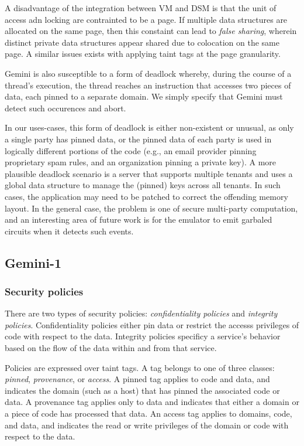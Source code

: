 %
A disadvantage of the integration between VM and DSM is that the unit of access
adn locking are contrainted to be a page.
%
If multiple data structures are allocated on the same page, then this constaint
can lead to \emph{false sharing}, wherein distinct private data structures
appear shared due to colocation on the same page.
%
A similar issues exists with applying taint tags at the page granularity.


Gemini is also susceptible to a form of deadlock whereby, during the course of
a thread's execution, the thread reaches an instruction that accesses two
pieces of data, each pinned to a separate domain.
%
We simply specify that Gemini must detect such occurences and abort.


In our uses-cases, this form of deadlock is either non-existent or unusual, as
only a single party has pinned data, or the pinned data of each party is used 
in logically different portions of the code (e.g., an email provider pinning
proprietary spam rules, and an organization pinning a private key).
%
A more plausible deadlock scenario is a server that supports multiple tenants
and uses a global data structure to manage the (pinned) keys across all
tenants.
%
In such cases, the application may need to be patched to correct the offending
memory layout.
%
In the general case, the problem is one of secure multi-party computation, and
an interesting area of future work is for the emulator to emit garbaled
circuits when it detects such events.


\subsection{Gemini-1}

\subsubsection{Security policies}
%
There are two types of security policies: \emph{confidentiality policies} and
\emph{integrity policies}.
%
Confidentiality policies either pin data or restrict the accesss privileges of
code with respect to the data.
%
Integrity policies specificy a service's behavior
based on the flow of the data within and from that service. 


Policies are expressed over taint tags.
%
A tag belongs to one of three classes: \emph{pinned}, \emph{provenance},
or \emph{access}.
%
A pinned tag applies to code and data, and indicates the domain (such
as a host) that has pinned the associated code or data.
%
A provenance tag applies only to data and indicates that either a domain or a piece of
code has processed that data.
%
An access tag applies to domains, code, and data, and indicates the read or
write privileges of the domain or code with respect to the data.


